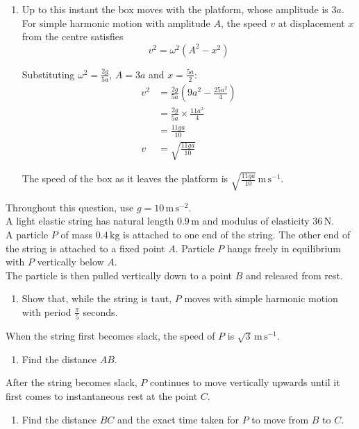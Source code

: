\documentclass[leqno]{article}
\begin{document}
\begin{enumerate}[
  label=\textbf{\arabic*.},
  leftmargin=*,
  topsep=0pt,
  partopsep=0pt,
  parsep=0pt
]
\begin{djsSolution}
\begin{enumerate}[label=\textbf{(\alph*)}, start=1]
\item Up to this instant the box moves with the platform, whose amplitude is \(3a\). For simple harmonic motion with amplitude \(A\), the speed \(v\) at displacement \(x\) from the centre satisfies
\[
v^2=\omega^2\left(A^2-x^2\right)
\]

Substituting \(\omega^2=\frac{2g}{5a}\), \(A=3a\) and \(x=\frac{5a}{2}\):
\begin{align*}
v^2&=\frac{2g}{5a}\left(9a^2-\frac{25a^2}{4}\right)\\
&=\frac{2g}{5a}\times\frac{11a^2}{4}\\
&=\frac{11ga}{10}\\
v&=\sqrt{\frac{11ga}{10}}
\end{align*}

The speed of the box as it leaves the platform is \(\sqrt{\frac{11ga}{10}}\,\mathrm{m\,s^{-1}}\).
\end{enumerate}
\end{djsSolution}

\newpage

\questionitem

Throughout this question, use $g = 10\,\mathrm{m\,s^{-2}}$. \\
A light elastic string has natural length $0.9\,\mathrm{m}$ and modulus of elasticity $36\,\mathrm{N}$. \\
A particle $P$ of mass $0.4\,\mathrm{kg}$ is attached to one end of the string. The other end of the string is attached to a fixed point $A$. Particle $P$ hangs freely in equilibrium with $P$ vertically below $A$. \\
The particle is then pulled vertically down to a point $B$ and released from rest. \\
\begin{enumerate}[label=\textbf{(\alph*)}]
\item Show that, while the string is taut, $P$ moves with simple harmonic motion with period $\frac{\pi}{5}$ seconds.  \\
\end{enumerate}
When the string first becomes slack, the speed of $P$ is $\sqrt{3}\,\mathrm{m\,s^{-1}}$. \\
\begin{enumerate}[resume, label=\textbf{(\alph*)}]
\item Find the distance $AB$.  \\
\end{enumerate}
After the string becomes slack, $P$ continues to move vertically upwards until it first comes to instantaneous rest at the point $C$. \\
\begin{enumerate}[resume, label=\textbf{(\alph*)}]
\item Find the distance $BC$ and the exact time taken for $P$ to move from $B$ to $C$.  \\
\end{enumerate}


\end{enumerate}
\end{document}
